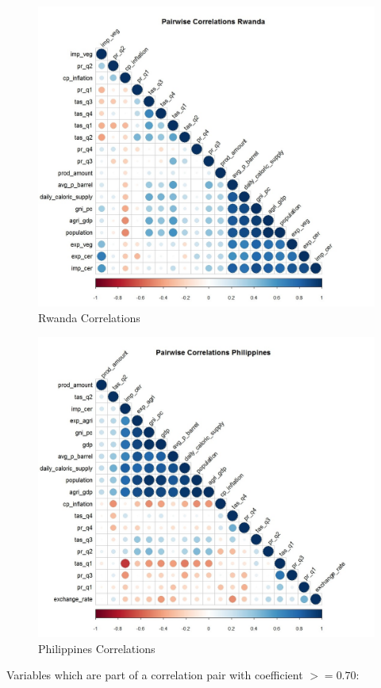 \documentclass[12pt,a4paper,english]{article}
\begin{document}
\begin{figure}[!htb]
\begin{center}
\includegraphics[scale=0.5]{R2.jpg}
\caption{Rwanda Correlations}
\label{figure7}
\end{center}
\end{figure}

\begin{figure}[!htb]
\begin{center}
\includegraphics[scale=0.5]{R3.jpg}
\caption{Philippines Correlations}
\label{figure8}
\end{center}
\end{figure}
Variables which are part of a correlation pair with coefficient $>= 0.70$:
\end{document}

